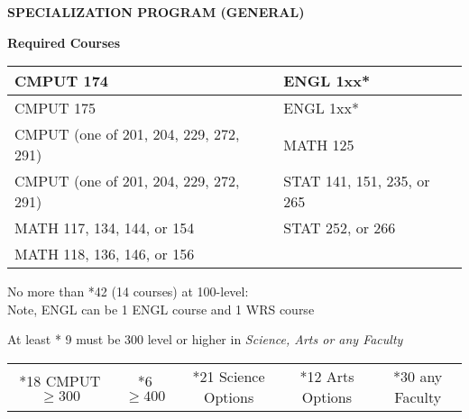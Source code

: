 \documentclass[12pt]{article}
\begin{document}
\begin{center}
    \textbf{SPECIALIZATION PROGRAM (GENERAL)}
\end{center}
\textbf{Required Courses}
\begin{center}
\begin{tabular}{| l | l | }
  \hline
 CMPUT 174\qquad\qquad\qquad\qquad \hfill\raisebox{-3px}{\CheckBox[\symbolchoice{check},height=.25in,width=.25in, name=c]{}} & ENGL 1xx* \qquad\qquad\qquad\qquad\qquad\hfill\raisebox{-3px}{\CheckBox[height=.25in,width=.25in, name=d]{}}\\ 
  \hline
 CMPUT 175 \hfill\raisebox{-3px}{\CheckBox[height=0.25in,width=0.25in, name=a]{}}& ENGL 1xx* \hfill\raisebox{-3px}{\CheckBox[width=0.25in,height=0.25in, name=b]{}}\\
  \hline
 CMPUT (one of 201, 204, 229, 272, 291) \hfill\raisebox{-3px}{\CheckBox[height=0.25in,width=0.25in, name=1]{}}& MATH 125 \hfill\raisebox{-3px}{\CheckBox[height=0.25in,width=0.25in, name=69]{}}\\
  \hline
  CMPUT (one of 201, 204, 229, 272, 291) \hfill\raisebox{-3px}{\CheckBox[height=0.25in,width=0.25in, name=3]{}}& STAT 141, 151, 235, or 265\hfill\raisebox{-3px}{\CheckBox[height=0.25in,width=0.25in, name=ask]{}} \\
  \hline
 MATH 117, 134, 144, or 154 \hfill\raisebox{-3px}{\CheckBox[height=0.25in,width=0.25in, name=2]{}}& STAT 252, or 266\hfill\raisebox{-3px}{\CheckBox[height=0.25in,width=0.25in, name=8]{}}\\
  \hline
 MATH 118, 136, 146, or  156\hfill\raisebox{-3px}{\CheckBox[height=0.25in,width=0.25in, name=4]{}} & \\
  \hline
\end{tabular}
\end{center}

\noindent No more than *42 (14 courses) at 100-level: \hfill\raisebox{-3px}{\CheckBox[height=0.25in,width=0.25in, name=209]{}}\\
\noindent *Note, ENGL can be 1 ENGL course and 1 WRS course

\noindent At least * 9 must be 300 level or higher in \textit{Science, Arts or any Faculty} \hfill\raisebox{-3px}{\CheckBox[height=0.25in,width=0.25in, name=210]{}}\\

\vspace{-1cm}
\begin{center}
\begin{tabular}{c c c c c}
*18 CMPUT $\ge300$ & *6 $\ge400$ & *21 Science Options & *12 Arts Options & *30 any Faculty
\end{tabular}
\end{center}
\end{document}

